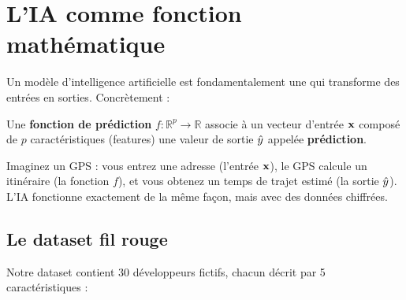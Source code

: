 





\tableofcontents
\newpage

\section{L'IA comme fonction mathématique}

Un modèle d'intelligence artificielle est fondamentalement une  qui transforme des entrées en sorties. Concrètement :


\begin{definitionbox}
    Une \textbf{fonction de prédiction} $f : \mathbb{R}^p \to \mathbb{R}$ associe à un vecteur d'entrée $\mathbf{x}$ composé de $p$ caractéristiques (features) une valeur de sortie $\hat{y}$ appelée \textbf{prédiction}.
\end{definitionbox}

\begin{intuitionbox}
    Imaginez un GPS : vous entrez une adresse (l'entrée $\mathbf{x}$), le GPS calcule un itinéraire (la fonction $f$), et vous obtenez un temps de trajet estimé (la sortie $\hat{y}$). L'IA fonctionne exactement de la même façon, mais avec des données chiffrées.
\end{intuitionbox}

\subsection{Le dataset fil rouge}

Notre dataset contient 30 développeurs fictifs, chacun décrit par 5 caractéristiques :


